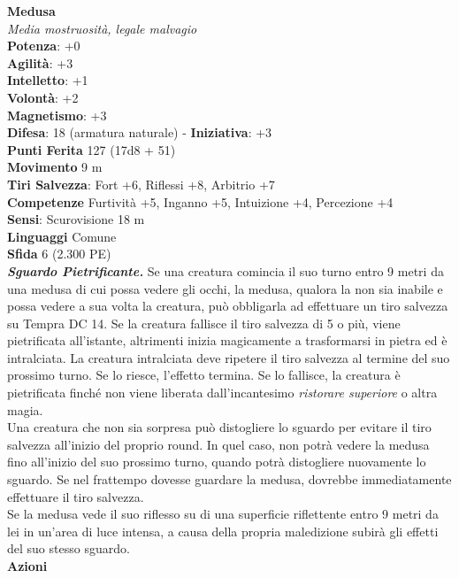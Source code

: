 \begin{multicols}{2}
\medskip\textbf{Medusa}\\
\emph{Media mostruosità, legale malvagio}\\
\textbf{Potenza}: +0\\
\textbf{Agilità}: +3\\
\textbf{Intelletto}: +1\\
\textbf{Volontà}: +2\\
\textbf{Magnetismo}: +3\\
\textbf{Difesa}: 18 (armatura naturale) - \textbf{Iniziativa}: +3\\
\textbf{Punti Ferita} 127 (17d8 + 51)\\
\textbf{Movimento} 9 m\\
\textbf{Tiri Salvezza}: Fort +6, Riflessi +8, Arbitrio +7\\
\textbf{Competenze} Furtività +5, Inganno +5, Intuizione +4, Percezione +4\\
\textbf{Sensi}: Scurovisione 18 m\\
\textbf{Linguaggi} Comune\\
\textbf{Sfida} 6 (2.300 PE)\smallskip\\
\emph{\textbf{Sguardo Pietrificante.}} Se una creatura comincia il suo turno entro 9 metri da una medusa di cui possa vedere gli occhi, la medusa, qualora la non sia inabile e possa vedere a sua volta la creatura, può obbligarla ad effettuare un tiro salvezza su Tempra DC 14. Se la creatura fallisce il tiro salvezza di 5 o più, viene pietrificata all'istante, altrimenti inizia magicamente a trasformarsi in pietra ed è intralciata. La creatura intralciata deve ripetere il tiro salvezza al termine del suo prossimo turno. Se lo riesce, l'effetto termina. Se lo fallisce, la creatura è pietrificata finché non viene liberata dall'incantesimo \emph{ristorare superiore} o altra magia.\\
Una creatura che non sia sorpresa può distogliere lo sguardo per evitare il tiro salvezza all'inizio del proprio round. In quel caso, non potrà vedere la medusa fino all'inizio del suo prossimo turno, quando potrà distogliere nuovamente lo sguardo. Se nel frattempo dovesse guardare la medusa, dovrebbe immediatamente effettuare il tiro salvezza.\\
Se la medusa vede il suo riflesso su di una superficie riflettente entro 9 metri da lei in un'area di luce intensa, a causa della propria maledizione subirà gli effetti del suo stesso sguardo.\\

\smallskip\textbf{Azioni}\\


\end{multicols}

